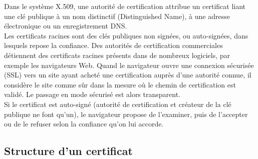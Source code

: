 \documentclass[a4paper,11pt,french]{article}
\begin{document}
Dans le système X.509, une autorité de certification attribue un certificat liant une clé publique à un nom distinctif (Distinguished Name), à une adresse électronique ou un enregistrement DNS.\\

Les certificats racines sont des clés publiques non signées, ou auto-signées, dans lesquels repose la confiance. Des autorités de certification commerciales détiennent des certificats racines présents dans de nombreux logiciels, par exemple les navigateurs Web. Quand le navigateur ouvre une connexion sécurisée (SSL) vers un site ayant acheté une certification auprès d'une autorité connue, il considère le site comme sûr dans la mesure où le chemin de certification est validé. Le passage en mode sécurisé est alors transparent.\\

Si le certificat est auto-signé (autorité de certification et créateur de la clé publique ne font qu'un), le navigateur propose de l'examiner, puis de l'accepter ou de le refuser selon la confiance qu'on lui accorde.\\

\subsection{Structure d'un certificat}
\end{document}
